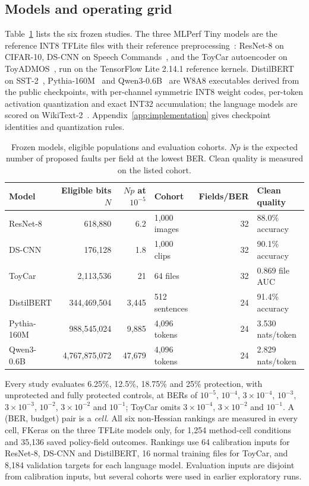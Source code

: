 \subsection{Models and operating grid}
Table~\ref{tab:models} lists the six frozen studies. The three MLPerf Tiny models are the reference INT8 TFLite files with their reference preprocessing~\cite{banbury2021mlperf,mlcommons2026tiny}: ResNet-8 on CIFAR-10, DS-CNN on Speech Commands~\cite{warden2018speechcommands}, and the ToyCar autoencoder on ToyADMOS~\cite{koizumi2019toyadmos}, run on the TensorFlow Lite 2.14.1 reference kernels. DistilBERT on SST-2~\cite{sanh2019distilbert,socher2013sentiment}, Pythia-160M~\cite{biderman2023pythia} and Qwen3-0.6B~\cite{yang2025qwen3} are W8A8 executables derived from the public checkpoints, with per-channel symmetric INT8 weight codes, per-token activation quantization and exact INT32 accumulation; the language models are scored on WikiText-2~\cite{merity2017pointer}. Appendix~\ref{app:implementation} gives checkpoint identities and quantization rules.

\begin{table}[t]
\caption{Frozen models, eligible populations and evaluation cohorts. $Np$ is the expected number of proposed faults per field at the lowest BER. Clean quality is measured on the listed cohort.}\label{tab:models}
\centering\small
\begin{tabular}{l r r l r l}\toprule
Model & Eligible bits $N$ & $Np$ at $10^{-5}$ & Cohort & Fields/BER & Clean quality\\\midrule
ResNet-8 & 618,880 & 6.2 & 1,000 images & 32 & 88.0\% accuracy\\
DS-CNN & 176,128 & 1.8 & 1,000 clips & 32 & 90.1\% accuracy\\
ToyCar & 2,113,536 & 21 & 64 files & 32 & 0.869 file AUC\\
DistilBERT & 344,469,504 & 3,445 & 512 sentences & 24 & 91.4\% accuracy\\
Pythia-160M & 988,545,024 & 9,885 & 4,096 tokens & 24 & 3.530 nats/token\\
Qwen3-0.6B & 4,767,875,072 & 47,679 & 4,096 tokens & 24 & 2.829 nats/token\\\bottomrule
\end{tabular}
\end{table}

Every study evaluates 6.25\%, 12.5\%, 18.75\% and 25\% protection, with unprotected and fully protected controls, at BERs of $10^{-5}$, $10^{-4}$, $3\!\times\!10^{-4}$, $10^{-3}$, $3\!\times\!10^{-3}$, $10^{-2}$, $3\!\times\!10^{-2}$ and $10^{-1}$; ToyCar omits $3\!\times\!10^{-4}$, $3\!\times\!10^{-2}$ and $10^{-1}$. A (BER, budget) pair is a \emph{cell}. All six non-Hessian rankings are measured in every cell, FKeras on the three TFLite models only, for 1,254 method-cell conditions and 35,136 saved policy-field outcomes. Rankings use 64 calibration inputs for ResNet-8, DS-CNN and DistilBERT, 16 normal training files for ToyCar, and 8,184 validation targets for each language model. Evaluation inputs are disjoint from calibration inputs, but several cohorts were used in earlier exploratory runs.

